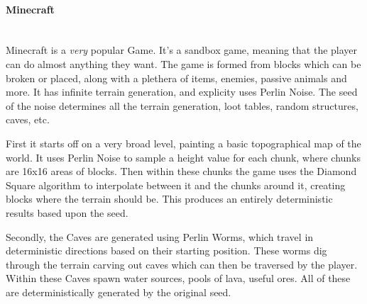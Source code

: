 \begin{flushleft}
                    \paragraph{Minecraft} \mbox{} \\
                        \vspace{0.2cm}
                        Minecraft is a \textit{very} popular Game. It's a sandbox game, meaning that the player can do almost anything they want.
                        The game is formed from blocks which can be broken or placed, along with a plethera of items, enemies, passive animals
                        and more. It has infinite terrain generation, and explicity uses Perlin Noise. The seed of the noise determines
                        all the terrain generation, loot tables, random structures, caves, etc. \\
                        
                        \vspace{0.2cm}

                        First it starts off on a very broad level, painting a basic topographical map of the world. It uses Perlin Noise to sample
                        a height value for each chunk, where chunks are 16x16 areas of blocks. Then within these chunks the game uses the Diamond Square
                        algorithm to interpolate between it and the chunks around it, creating blocks where the terrain should be. This produces an 
                        entirely deterministic results based upon the seed.\\

                        \vspace{0.2cm}

                        Secondly, the Caves are generated using Perlin Worms, which travel in deterministic directions based on their starting position.
                        These worms dig through the terrain carving out caves which can then be traversed by the player. Within these Caves spawn water
                        sources, pools of lava, useful ores. All of these are deterministically generated by the original seed. \\ 



\end{flushleft}
